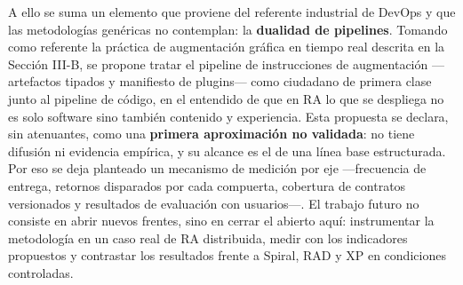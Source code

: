 \documentclass[conference]{IEEEtran}
\begin{document}
A ello se suma un elemento que proviene del referente industrial de DevOps y que las metodologías genéricas no contemplan: la \textbf{dualidad de pipelines}. Tomando como referente la práctica de augmentación gráfica en tiempo real descrita en la Sección III-B, se propone tratar el pipeline de instrucciones de augmentación —artefactos tipados y manifiesto de plugins— como ciudadano de primera clase junto al pipeline de código, en el entendido de que en RA lo que se despliega no es solo software sino también contenido y experiencia. Esta propuesta se declara, sin atenuantes, como una \textbf{primera aproximación no validada}: no tiene difusión ni evidencia empírica, y su alcance es el de una línea base estructurada. Por eso se deja planteado un mecanismo de medición por eje —frecuencia de entrega, retornos disparados por cada compuerta, cobertura de contratos versionados y resultados de evaluación con usuarios—. El trabajo futuro no consiste en abrir nuevos frentes, sino en cerrar el abierto aquí: instrumentar la metodología en un caso real de RA distribuida, medir con los indicadores propuestos y contrastar los resultados frente a Spiral, RAD y XP en condiciones controladas.
\end{document}
